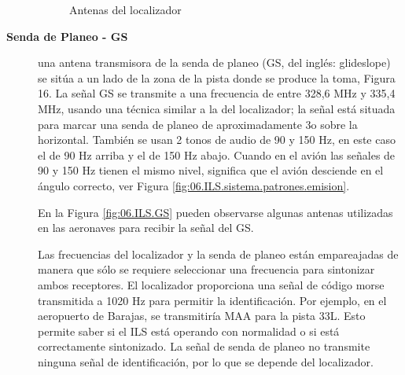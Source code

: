 \begin{description}
\begin{figure}[!htb]

  
  \caption{Antenas del localizador}
  \label{fig:06.ILS.antenas.localizador}
\end{figure}

\item [\bf Senda de Planeo - GS] una antena transmisora de la senda de planeo (GS, del inglés:
glideslope) se sitúa a un lado de la zona de la pista donde se produce la toma, Figura 16.
La señal GS se transmite a una frecuencia de entre 328,6 MHz y 335,4 MHz, usando una
técnica similar a la del localizador; la señal está situada para marcar una senda de planeo de
aproximadamente 3o sobre la horizontal. También se usan 2 tonos de audio de 90 y 150 Hz, en
este caso el de 90 Hz arriba y el de 150 Hz abajo. Cuando en el avión las señales de 90 y 150
Hz tienen el mismo nivel, significa que el avión desciende en el ángulo correcto,
ver Figura \ref{fig:06.ILS.sistema.patrones.emision}.

En la Figura \ref{fig:06.ILS.GS} pueden observarse algunas antenas utilizadas en las aeronaves para recibir la
señal del GS.

Las frecuencias del localizador y la senda de planeo están empareajadas de manera que sólo se
requiere seleccionar una frecuencia para sintonizar ambos receptores. El localizador proporciona
una señal de código morse transmitida a 1020 Hz para permitir la identificación. Por ejemplo,
en el aeropuerto de Barajas, se transmitiría MAA para la pista 33L. Esto permite saber si el
ILS está operando con normalidad o si está correctamente sintonizado. La señal de senda de
planeo no transmite ninguna señal de identificación, por lo que se depende del localizador.


\end{description}
